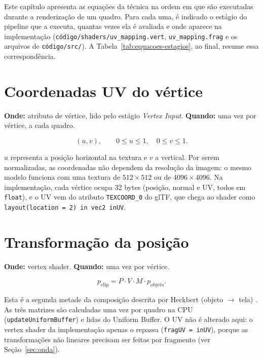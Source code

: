 
Este capítulo apresenta as equações da técnica na ordem em que são executadas durante a renderização de um quadro. Para cada uma, é indicado o estágio do pipeline que a executa, quantas vezes ela é avaliada e onde aparece na implementação (\texttt{código/shaders/uv\_mapping.vert}, \texttt{uv\_mapping.frag} e os arquivos de \texttt{código/src/}). A Tabela~\ref{tab:equacoes-estagios}, ao final, resume essa correspondência.

\section{Coordenadas UV do vértice}

\textbf{Onde:} atributo de vértice, lido pelo estágio \textit{Vertex Input}. \textbf{Quando:} uma vez por vértice, a cada quadro.

\begin{equation}
(u,v), \qquad 0\leq u\leq1,\quad 0\leq v\leq1.
\label{eq:uv}
\end{equation}

\(u\) representa a posição horizontal na textura e \(v\) a vertical. Por serem normalizadas, as coordenadas não dependem da resolução da imagem: o mesmo modelo funciona com uma textura de \(512\times512\) ou de \(4096\times4096\). Na implementação, cada vértice ocupa 32 bytes (posição, normal e UV, todos em \texttt{float}), e o UV vem do atributo \texttt{TEXCOORD\_0} do glTF, que chega ao shader como \texttt{layout(location = 2) in vec2 inUV}.

\section{Transformação da posição}

\textbf{Onde:} vertex shader. \textbf{Quando:} uma vez por vértice.

\begin{equation}
p_{\text{clip}} = P \cdot V \cdot M \cdot p_{\text{objeto}}.
\label{eq:mvp}
\end{equation}

Esta é a segunda metade da composição descrita por Heckbert (objeto \(\rightarrow\) tela) \cite[p.~2]{heckbert1986}. As três matrizes são calculadas uma vez por quadro na CPU (\texttt{updateUniformBuffer}) e lidas do Uniform Buffer. O UV não é alterado aqui: o vertex shader da implementação apenas o repassa (\texttt{fragUV = inUV}), porque as transformações não lineares precisam ser feitas por fragmento (ver Seção~\ref{sec:onda}).

